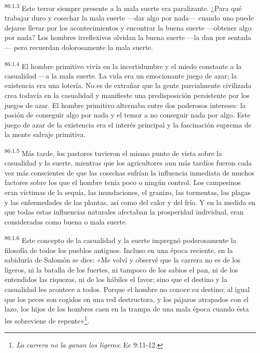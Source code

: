 \par
\textsuperscript{86:1.3} Este terror siempre presente a la mala suerte era paralizante. ¿Para qué trabajar duro y cosechar la mala suerte ---dar algo por nada--- cuando uno puede dejarse llevar por los acontecimientos y encontrar la buena suerte ---obtener algo por nada? Los hombres irreflexivos olvidan la buena suerte ---la dan por sentada--- pero recuerdan dolorosamente la mala suerte.

\par
\textsuperscript{86:1.4} El hombre primitivo vivía en la incertidumbre y el miedo constante a la casualidad ---a la mala suerte. La vida era un emocionante juego de azar; la existencia era una lotería. No es de extrañar que la gente parcialmente civilizada crea todavía en la casualidad y manifieste una predisposición persistente por los juegos de azar. El hombre primitivo alternaba entre dos poderosos intereses: la pasión de conseguir algo por nada y el temor a no conseguir nada por algo. Este juego de azar de la existencia era el interés principal y la fascinación suprema de la mente salvaje primitiva.

\par
\textsuperscript{86:1.5} Más tarde, los pastores tuvieron el mismo punto de vista sobre la casualidad y la suerte, mientras que los agricultores aun más tardíos fueron cada vez más conscientes de que las cosechas sufrían la influencia inmediata de muchos factores sobre los que el hombre tenía poco o ningún control. Los campesinos eran víctimas de la sequía, las inundaciones, el granizo, las tormentas, las plagas y las enfermedades de las plantas, así como del calor y del frío. Y en la medida en que todas estas influencias naturales afectaban la prosperidad individual, eran consideradas como buena o mala suerte.

\par
\textsuperscript{86:1.6} Este concepto de la casualidad y la suerte impregnó poderosamente la filosofía de todos los pueblos antiguos. Incluso en una época reciente, en la sabiduría de Salomón se dice: «Me volví y observé que la carrera no es de los ligeros, ni la batalla de los fuertes, ni tampoco de los sabios el pan, ni de los entendidos las riquezas, ni de los hábiles el favor; sino que el destino y la casualidad les acontece a todos. Porque el hombre no conoce su destino; al igual que los peces son cogidos en una red destructora, y los pájaros atrapados con el lazo, los hijos de los hombres caen en la trampa de una mala época cuando ésta les sobreviene de repente»\footnote{\textit{La carrera no la ganan los ligeros}: Ec 9:11-12.}.

